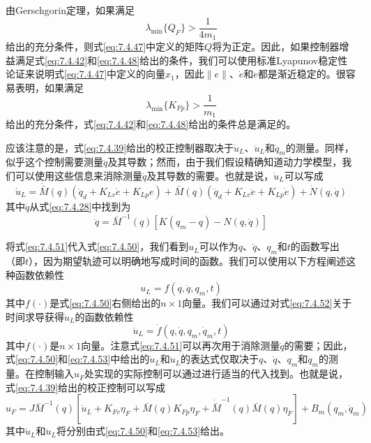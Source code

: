 \documentclass[UTF8]{ctexart}
\begin{document}
由Gerschgorin定理，如果满足
\begin{equation}\label{eq:7.4.48}
\lambda_{\min}\{Q_F\} > \frac{1}{4m_1}
\end{equation}
给出的充分条件，则式\eqref{eq:7.4.47}中定义的矩阵$Q$将为正定。因此，如果控制器增益满足式\eqref{eq:7.4.42}和\eqref{eq:7.4.48}给出的条件，我们可以使用标准Lyapunov稳定性论证来说明式\eqref{eq:7.4.47}中定义的向量$x_1$，因此$\|e\|$、$\dot{e}$和$\ddot{e}$都是渐近稳定的。很容易表明，如果满足
\begin{equation}\label{eq:7.4.49}
\lambda_{\min}\{K_{Fp}\} > \frac{1}{m_1}
\end{equation}
给出的充分条件，式\eqref{eq:7.4.42}和\eqref{eq:7.4.48}给出的条件总是满足的。

应该注意的是，式\eqref{eq:7.4.39}给出的校正控制器取决于$\dot{u}_L$、$\ddot{u}_L$和$\dot{q}_m$的测量。同样，似乎这个控制需要测量$\ddot{q}$及其导数；然而，由于我们假设精确知道动力学模型，我们可以使用这些信息来消除测量$\ddot{q}$及其导数的需要。也就是说，$\dot{u}_L$可以写成
\begin{equation}\label{eq:7.4.50}
\dot{u}_L = \dot{\bar{M}}(q)(\ddot{q}_d + K_{Lv}\dot{e} + K_{Lp}e) + \bar{M}(q)(\dddot{q}_d + K_{Lv}\ddot{e} + K_{Lp}\dot{e}) + \dot{N}(q,\dot{q})
\end{equation}
其中$\ddot{q}$从式\eqref{eq:7.4.28}中找到为
\begin{equation}\label{eq:7.4.51}
\ddot{q} = \bar{M}^{-1}(q)[K(q_m - q) - N(q,\dot{q})]
\end{equation}

将式\eqref{eq:7.4.51}代入式\eqref{eq:7.4.50}，我们看到$u_L$可以作为$q$、$\dot{q}$、$q_m$和$t$的函数写出（即$t$），因为期望轨迹可以明确地写成时间的函数。我们可以使用以下方程阐述这种函数依赖性
\begin{equation}\label{eq:7.4.52}
u_L = f(q, \dot{q}, q_m, t)
\end{equation}
其中$f(\cdot)$是式\eqref{eq:7.4.50}右侧给出的$n \times 1$向量。我们可以通过对式\eqref{eq:7.4.52}关于时间求导获得$\ddot{u}_L$的函数依赖性
\begin{equation}\label{eq:7.4.53}
\ddot{u}_L = \dot{f}(q, \dot{q}, q_m, \dot{q}_m, t)
\end{equation}
其中$\dot{f}(\cdot)$是$n \times 1$向量。注意式\eqref{eq:7.4.51}可以再次用于消除测量$\ddot{q}$的需要；因此，式\eqref{eq:7.4.50}和\eqref{eq:7.4.53}中给出的$\dot{u}_L$和$\ddot{u}_L$的表达式仅取决于$q$、$\dot{q}$、$q_m$和$\dot{q}_m$的测量。在控制输入$u_F$处实现的实际控制可以通过进行适当的代入找到。也就是说，式\eqref{eq:7.4.39}给出的校正控制可以写成
\begin{equation}\label{eq:7.4.54}
u_F = J\bar{M}^{-1}(q)[\dot{u}_L + K_{Fv}\eta_F + \bar{M}(q)K_{Fp}\eta_F + \dot{\bar{M}}^{-1}(q)\bar{M}(q)\eta_F] + B_m(q_m,\dot{q}_m)
\end{equation}
其中$\dot{u}_L$和$\ddot{u}_L$将分别由式\eqref{eq:7.4.50}和\eqref{eq:7.4.53}给出。
\end{document}
